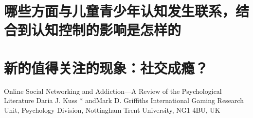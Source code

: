 \section{哪些方面与儿童青少年认知发生联系，结合到认知控制的影响是怎样的  %
}

\section{新的值得关注的现象：社交成瘾？  %
}

Online Social Networking and Addiction—A Review of the Psychological Literature
Daria J. Kuss *   andMark D. Griffiths 
International Gaming Research Unit, Psychology Division, Nottingham Trent University, NG1 4BU, UK

